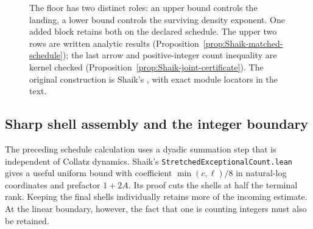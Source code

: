 \begin{figure}[ht]
\centering
{}
\caption{The floor has two distinct roles: an upper bound controls the
landing, a lower bound controls the surviving density exponent.
One added block retains both on the declared schedule.
The upper two rows are written analytic results
(Proposition~\ref{prop:Shaik-matched-schedule}); the last arrow and
positive-integer count inequality are kernel checked
(Proposition~\ref{prop:Shaik-joint-certificate}).
The original construction is Shaik's \cite{Shaik2026v324},
with exact module locators in the text.}
\end{figure}

\subsection{Sharp shell assembly and the integer boundary}

The preceding schedule calculation uses a dyadic summation step that is
independent of Collatz dynamics. Shaik's
\texttt{StretchedExceptionalCount.lean} gives a useful uniform bound
with coefficient \(\min(c,\ell)/8\) in natural-log coordinates and
prefactor \(1+2A\). Its proof cuts the shells at half the terminal
rank. Keeping the final shells individually retains more of the
incoming estimate. At the linear boundary, however, the fact that
one is counting integers must also be retained.

